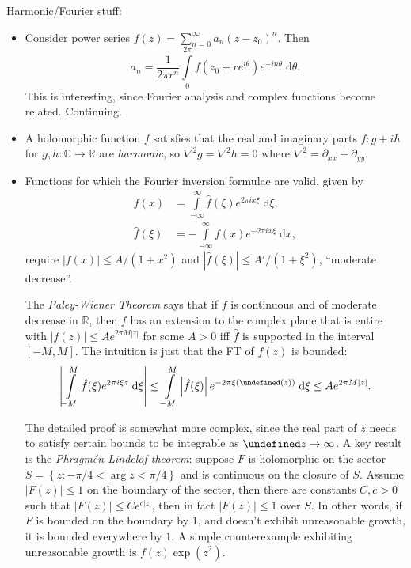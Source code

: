 \documentclass[11pt,
        usenames, %
        dvipsnames %
    ]{report}
\newcommand*{\abs}[1]{\left|#1\right|}
\newcommand*{\p}[1]{\left(#1\right)}
\newcommand*{\s}[1]{\left[#1\right]}
\newcommand*{\z}[1]{\left\{#1\right\}}
\let\Re\undefined
\let\Im\undefined
\DeclareMathOperator{\Re}{Re}
\DeclareMathOperator{\Im}{Im}
\begin{document}
Harmonic/Fourier stuff:
\begin{itemize}
    \item Consider power series $f(z) = \sum\limits_{n = 0}^\infty a_n\p{z -
        z_0}^n$. Then
        \begin{equation}
            a_n = \frac{1}{2\pi r^n}\int\limits_{0}^{2\pi}
                f\p{z_0 + re^{i\theta}}e^{-in\theta}\;\mathrm{d}\theta.
        \end{equation}
        This is interesting, since Fourier analysis and complex functions become
        related. Continuing.

    \item A holomorphic function $f$ satisfies that the real and imaginary parts
        $f: g + ih$ for $g, h: \mathbb{C} \to \mathbb{R}$ are \emph{harmonic},
        so $\nabla^2 g = \nabla^2 h = 0$ where $\nabla^2 = \partial_{xx} +
        \partial_{yy}$.

    \item Functions for which the Fourier inversion formulae are valid, given by
        \begin{align}
            f(x) &= \int\limits_{-\infty}^\infty
                \hat{f}\p{\xi}e^{2\pi i x \xi}\;\mathrm{d}\xi,\\
            \hat{f}(\xi) &= -\int\limits_{-\infty}^\infty
                f(x) e^{-2\pi ix\xi}\;\mathrm{d}x,
        \end{align}
        require $\abs{f(x)} \leq A / \p{1 + x^2}$ and $\abs{\hat{f}\p{\xi}} \leq
        A' / (1 + \xi^2)$, ``moderate decrease''.

        The \emph{Paley-Wiener Theorem} says that if $f$ is continuous and of
        moderate decrease in $\mathbb{R}$, then $f$ has an extension to the
        complex plane that is entire with $\abs{f(z)} \leq Ae^{2\pi M\abs{z}}$
        for some $A > 0$ iff $\hat{f}$ is supported in the interval $\s{-M, M}$.
        The intuition is just that the FT of $f(z)$ is bounded:
        \begin{equation}
            \abs{\int\limits_{-M}^M \hat{f}(\xi) e^{2\pi i \xi
                z}\;\mathrm{d}\xi}
                \leq
            \int\limits_{-M}^M \abs{\hat{f}(\xi)} e^{-2\pi \xi
                \p{\Im(z)}}\;\mathrm{d}\xi
                \leq Ae^{2\pi M\abs{z}}.
        \end{equation}

        The detailed proof is somewhat more complex, since the real part of $z$
        needs to satisfy certain bounds to be integrable as $\Re z \to \infty$.
        A key result is the \emph{Phragm\'en-Lindel\"of theorem}: suppose $F$ is
        holomorphic on the sector $S = \z{z: -\pi/4 < \arg z < \pi/4}$ and is
        continuous on the closure of $S$. Assume $\abs{F(z)} \leq 1$ on the
        boundary of the sector, then there are constants $C, c > 0$ such that
        $\abs{F(z)} \leq Ce^{c\abs{z}}$, then in fact $\abs{F(z)} \leq 1$ over
        $S$. In other words, if $F$ is bounded on the boundary by $1$, and
        doesn't exhibit unreasonable growth, it is bounded everywhere by $1$. A
        simple counterexample exhibiting unreasonable growth is $f(z)
        \exp(z^2)$.


\end{itemize}
\end{document}
